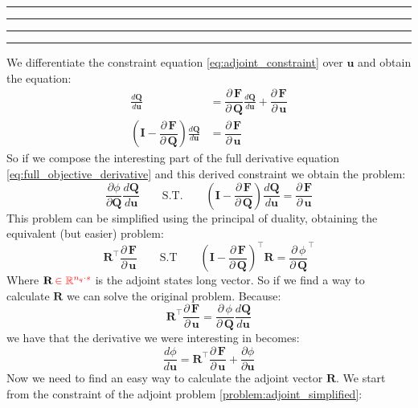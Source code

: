 \documentclass{article}
\newcommand{\doubleline}{
    \vspace{1ex}
    \hrule
    \pagebreak[1] %
    \vspace{0.4ex}
    \hrule
    \vspace{1ex}
}
\newcommand{\pd}[2]{\dfrac{\partial\, #1}{\partial\, #2}}
\newcommand{\red}[1]{\textcolor{red}{#1}}
\begin{document}
\begin{derivation}
\vspace{1ex}
\doubleline
\vspace{1ex}
\doubleline
\vspace{1ex}

\noindent We differentiate the constraint equation \ref{eq:adjoint_constraint} over $\mathbf{u}$ and obtain the equation:
\begin{equation*}
\begin{aligned}
    \frac{d\mathbf{Q}}{d\mathbf{u}} &= \pd{\mathbf{F}}{\mathbf{Q}} \frac{d\mathbf{Q}}{d\mathbf{u}} + \pd{\mathbf{F}}{\mathbf{u}} \\[1ex]
    \left(\mathbf{I} - \pd{\mathbf{F}}{\mathbf{Q}}\right)\frac{d\mathbf{Q}}{d\mathbf{u}} &= \pd{\mathbf{F}}{\mathbf{u}}
\end{aligned}
\end{equation*}
So if we compose the interesting part of the full derivative equation \ref{eq:full_objective_derivative} and this derived constraint we obtain the problem:
\begin{equation*}
    \frac{\partial \phi}{\partial \mathbf{Q}} 
    \frac{d\mathbf{Q}}{d\mathbf{u}} 
    \qquad 
    \text{S.T.}
    \qquad
    \left(\mathbf{I} - \pd{\mathbf{F}}{\mathbf{Q}}\right)\frac{d\mathbf{Q}}{d\mathbf{u}} = \pd{\mathbf{F}}{\mathbf{u}}
\end{equation*}
This problem can be simplified using the principal of duality, obtaining the equivalent (but easier) problem:
\begin{equation}
\label{problem:adjoint_simplified}
    \mathbf{R}^\top\pd{\mathbf{F}}{\mathbf{u}} 
    \qquad 
    \text{S.T}
    \qquad
    \left(\mathbf{I} - \pd{\mathbf{F}}{\mathbf{Q}}\right)^\top\mathbf{R} = \pd{\phi}{\mathbf{Q}}^\top
\end{equation}
Where $\mathbf{R}\,\red{\in \mathbb{R}^{n_q \cdot s}}$ is the adjoint states long vector. So if we find a way to calculate $\mathbf{R}$ we can solve the original problem. Because:
\begin{equation*}
    \mathbf{R}^\top\pd{\mathbf{F}}{\mathbf{u}} = 
    \pd{\phi}{\mathbf{Q}} \frac{d\mathbf{Q}}{d\mathbf{u}} 
\end{equation*}
we have that the derivative we were interesting in becomes:
\begin{equation}
\label{eq:adjoint_objective_derivative}
    \frac{d\phi}{d\mathbf{u}} =  \mathbf{R}^\top\pd{\mathbf{F}}{\mathbf{u}} + \frac{\partial \phi}{\partial \mathbf{u}}
\end{equation}
Now we need to find an easy way to calculate the adjoint vector $\mathbf{R}$. We start from the constraint of the adjoint problem \ref{problem:adjoint_simplified}:

\end{derivation}
\end{document}
